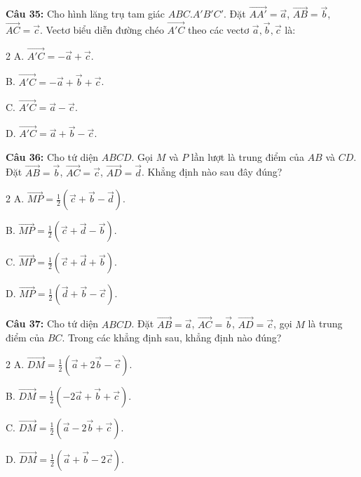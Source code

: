 \documentclass[12pt]{article}
\begin{document}
	\vspace{0.2cm}
	\noindent \textbf{Câu 35:} Cho hình lăng trụ tam giác $ABC.A'B'C'$. Đặt $\overrightarrow{AA'} = \vec{a}$, $\overrightarrow{AB} = \vec{b}$, $\overrightarrow{AC} = \vec{c}$. Vectơ biểu diễn đường chéo $\overrightarrow{A'C}$ theo các vectơ $\vec{a}, \vec{b}, \vec{c}$ là:
	\begin{multicols}{2}
		A. $\overrightarrow{A'C} = -\vec{a} + \vec{c}$. \par
		B. $\overrightarrow{A'C} = -\vec{a} + \vec{b} + \vec{c}$. \par
		C. $\overrightarrow{A'C} = \vec{a} - \vec{c}$. \par
		D. $\overrightarrow{A'C} = \vec{a} + \vec{b} - \vec{c}$.
	\end{multicols}
	
	\noindent \textbf{Câu 36:} Cho tứ diện $ABCD$. Gọi $M$ và $P$ lần lượt là trung điểm của $AB$ và $CD$. Đặt $\overrightarrow{AB} = \vec{b}$, $\overrightarrow{AC} = \vec{c}$, $\overrightarrow{AD} = \vec{d}$. Khẳng định nào sau đây đúng?
	\begin{multicols}{2}
		A. $\overrightarrow{MP} = \frac{1}{2}(\vec{c} + \vec{b} - \vec{d})$. \par
		B. $\overrightarrow{MP} = \frac{1}{2}(\vec{c} + \vec{d} - \vec{b})$. \par
		C. $\overrightarrow{MP} = \frac{1}{2}(\vec{c} + \vec{d} + \vec{b})$. \par
		D. $\overrightarrow{MP} = \frac{1}{2}(\vec{d} + \vec{b} - \vec{c})$.
	\end{multicols}
	
	\vspace{0.2cm}
	\noindent \textbf{Câu 37:} Cho tứ diện $ABCD$. Đặt $\overrightarrow{AB} = \vec{a}$, $\overrightarrow{AC} = \vec{b}$, $\overrightarrow{AD} = \vec{c}$, gọi $M$ là trung điểm của $BC$. Trong các khẳng định sau, khẳng định nào đúng?
	\begin{multicols}{2}
		A. $\overrightarrow{DM} = \frac{1}{2}(\vec{a} + 2\vec{b} - \vec{c})$. \par
		B. $\overrightarrow{DM} = \frac{1}{2}(-2\vec{a} + \vec{b} + \vec{c})$. \par
		C. $\overrightarrow{DM} = \frac{1}{2}(\vec{a} - 2\vec{b} + \vec{c})$. \par
		D. $\overrightarrow{DM} = \frac{1}{2}(\vec{a} + \vec{b} - 2\vec{c})$.
	\end{multicols}
	
\end{document}
